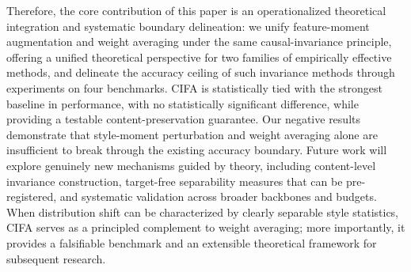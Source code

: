 \documentclass[electronics,article,submit,moreauthors]{Definitions/mdpi}
\begin{document}
Therefore, the core contribution of this paper is an operationalized theoretical integration and systematic boundary delineation: we unify feature-moment augmentation and weight averaging under the same causal-invariance principle, offering a unified theoretical perspective for two families of empirically effective methods, and delineate the accuracy ceiling of such invariance methods through experiments on four benchmarks. CIFA is statistically tied with the strongest baseline in performance, with no statistically significant difference, while providing a testable content-preservation guarantee. Our negative results demonstrate that style-moment perturbation and weight averaging alone are insufficient to break through the existing accuracy boundary. Future work will explore genuinely new mechanisms guided by theory, including content-level invariance construction, target-free separability measures that can be pre-registered, and systematic validation across broader backbones and budgets. When distribution shift can be characterized by clearly separable style statistics, CIFA serves as a principled complement to weight averaging; more importantly, it provides a falsifiable benchmark and an extensible theoretical framework for subsequent research.








\end{document}
